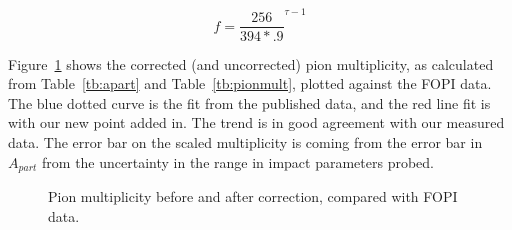 \documentclass[12pt, letterpaper, twoside]{article}
\begin{document}
\begin{equation}
f = \frac{256}{394 *.9}^{\tau -1}
\label{eq:corr}
\end{equation}


Figure~\ref{fig:mult} shows the corrected (and uncorrected) pion multiplicity, as calculated from Table~\ref{tb:apart} and Table~\ref{tb:pionmult}, plotted against the FOPI data. The blue dotted curve is the fit from the published data, and the red line fit is with our new point added in. The trend is in good agreement with our measured data. The error bar on the scaled multiplicity is coming from the error bar in $A_{part}$ from the uncertainty in the range in impact parameters probed.

\begin{figure}[!hbt]
\begin{adjustbox}{max width=\linewidth,center}
\centering
{}%
%
\end{adjustbox}
\caption{Pion multiplicity before and after correction, compared with FOPI data.}
\label{fig:mult}

\end{figure}

\clearpage
\end{document}
